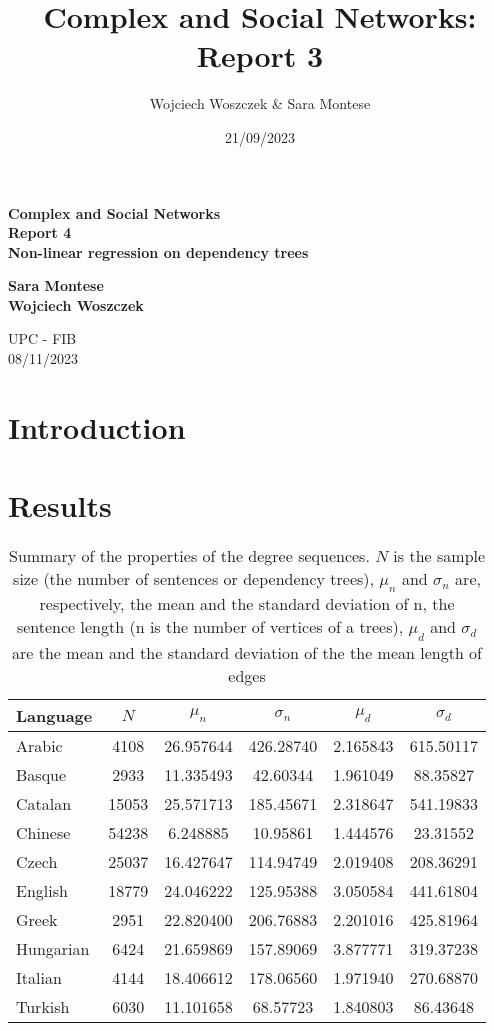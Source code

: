 \documentclass{article}
\title{Complex and Social Networks:\\
Report 3}
\author{Wojciech Woszczek \& Sara Montese}
\date{21/09/2023}
\begin{document}
\begin{titlepage}
    \begin{center}
        \vspace*{1cm}
            
        \LARGE
        \textbf{Complex and Social Networks\\
Report 4\\
Non-linear regression on dependency trees}
            
        \vspace{5.5cm}
        \Large
        \textbf{Sara Montese} \\
        \textbf{Wojciech Woszczek} 
        
            
        \vspace{0.8cm}
            
        \Large
        UPC - FIB\\
        08/11/2023
            
    \end{center}
\end{titlepage}
\clearpage

\section{Introduction}
\section{Results}

\begin{table}[H]
\centering
\begin{tabular}{lccccc}
\hline
Language & $N$ & $\mu_n$ & $\sigma_n$ & $\mu_d$ & $\sigma_d$ \\
\hline
Arabic & 4108 & 26.957644 & 426.28740 & 2.165843 & 615.50117 \\
Basque & 2933 & 11.335493 & 42.60344 & 1.961049 & 88.35827 \\
Catalan & 15053 & 25.571713 & 185.45671 & 2.318647 & 541.19833 \\
Chinese & 54238 & 6.248885 & 10.95861 & 1.444576 & 23.31552 \\
Czech & 25037 & 16.427647 & 114.94749 & 2.019408 & 208.36291 \\
English & 18779 & 24.046222 & 125.95388 & 3.050584 & 441.61804 \\
Greek & 2951 & 22.820400 & 206.76883 & 2.201016 & 425.81964 \\
Hungarian & 6424 & 21.659869 & 157.89069 & 3.877771 & 319.37238 \\
Italian & 4144 & 18.406612 & 178.06560 & 1.971940 & 270.68870 \\
Turkish & 6030 & 11.101658 & 68.57723 & 1.840803 & 86.43648 \\
\hline
\end{tabular}


\caption{ Summary of the properties of the degree sequences. $N$ is the sample
size (the number of sentences or dependency trees), $\mu_n$ and $\sigma_n$ are, respectively,
the mean and the standard deviation of n, the sentence length (n is the number
of vertices of a trees), $\mu_d$ and $\sigma_d$ are the mean and the standard deviation of
the the mean length of edges}
\label{pvals}
\end{table}
\end{document}
